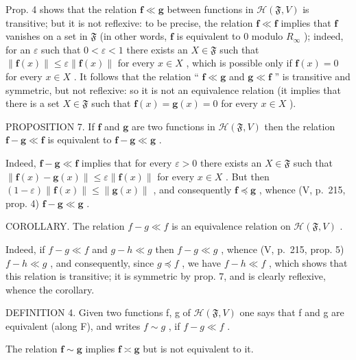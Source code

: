 Prop. 4 shows that the relation \(\mathbf{f} \ll \mathbf{g}\) between functions in \(\mathcal{H}(\mathfrak{F}, V)\) is transitive; but it is not reflexive: to be precise, the relation \(\mathbf{f} \ll \mathbf{f}\) implies that \(\mathbf{f}\) vanishes on a set in \(\mathfrak{F}\) (in other words, \(\mathbf{f}\) is equivalent to 0 modulo \(R_{\infty}\) ); indeed, for an \(\varepsilon\) such that \(0 < \varepsilon < 1\) there exists an \(X \in \mathfrak{F}\) such that \(\| \mathbf{f}(x) \| \leqslant \varepsilon \| \mathbf{f}(x) \|\) for every \(x \in X\) , which is possible only if \(\mathbf{f}(x) = 0\) for every \(x \in X\) . It follows that the relation `` \(\mathbf{f} \ll \mathbf{g}\) and \(\mathbf{g} \ll \mathbf{f}\) '' is transitive and symmetric, but not reflexive: so it is not an equivalence relation (it implies that there is a set \(X \in \mathfrak{F}\) such that \(\mathbf{f}(x) = \mathbf{g}(x) = 0\) for every \(x \in X\) ).

PROPOSITION 7. If \(\mathbf{f}\) and \(\mathbf{g}\) are two functions in \(\mathcal{H}(\mathfrak{F}, V)\) then the relation \(\mathbf{f} - \mathbf{g} \ll \mathbf{f}\) is equivalent to \(\mathbf{f} - \mathbf{g} \ll \mathbf{g}\) .

Indeed, \(\mathbf{f} - \mathbf{g} \ll \mathbf{f}\) implies that for every \(\varepsilon > 0\) there exists an \(X \in \mathfrak{F}\) such that \(\| \mathbf{f}(x) - \mathbf{g}(x) \| \leqslant \varepsilon \| \mathbf{f}(x) \|\) for every \(x \in X\) . But then \((1 - \varepsilon) \| \mathbf{f}(x) \| \leqslant \| \mathbf{g}(x) \|\) , and consequently \(\mathbf{f} \preccurlyeq \mathbf{g}\) , whence (V, p.~215, prop. 4) \(\mathbf{f} - \mathbf{g} \ll \mathbf{g}\) .

COROLLARY. The relation \(f - g \ll f\) is an equivalence relation on \(\mathcal{H}(\mathfrak{F}, V)\) .

Indeed, if \(f - g \ll f\) and \(g - h \ll g\) then \(f - g \ll g\) , whence (V, p.~215, prop. 5) \(f - h \ll g\) , and consequently, since \(g \preccurlyeq f\) , we have \(f - h \ll f\) , which shows that this relation is transitive; it is symmetric by prop. 7, and is clearly reflexive, whence the corollary.

DEFINITION 4. Given two functions f, g of \(\mathcal{H}(\mathfrak{F}, V)\) one says that f and g are equivalent (along F), and writes \(f \sim g\) , if \(f - g \ll f\) .

The relation \(\mathbf{f} \sim \mathbf{g}\) implies \(\mathbf{f} \asymp \mathbf{g}\) but is not equivalent to it.

